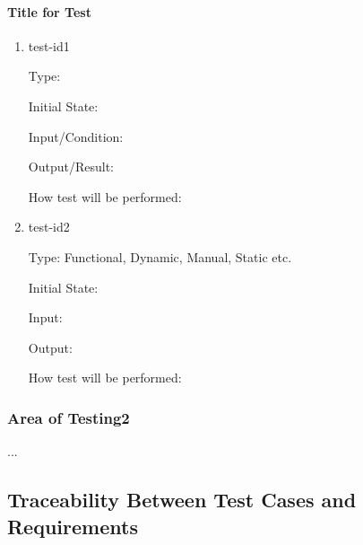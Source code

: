 \documentclass[12pt, titlepage]{article}
\begin{document}
\paragraph{Title for Test}

\begin{enumerate}

\item{test-id1\\}

Type: 
					
Initial State: 
					
Input/Condition: 
					
Output/Result: 
					
How test will be performed: 
					
\item{test-id2\\}

Type: Functional, Dynamic, Manual, Static etc.
					
Initial State: 
					
Input: 
					
Output: 
					
How test will be performed: 

\end{enumerate}

\subsubsection{Area of Testing2}

...

\subsection{Traceability Between Test Cases and Requirements}


		

\end{document}

